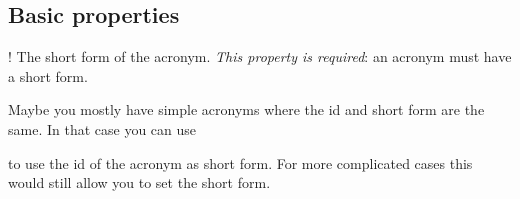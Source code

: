 \documentclass{acro-manual}
\begin{document}
\subsection{Basic properties}\label{sec:basic-properties}
\begin{properties}
  \Default!
    The short form of the acronym.  \emph{This property is required}: an
    acronym must have a short form.
\end{properties}
Maybe you mostly have simple acronyms where the \ac{id} and short form are
the same.  In that case you can use
\begin{options}
    to use the \ac{id} of the acronym as short form. For more complicated
    cases this would still allow you to set the short form.
\end{options}
\end{document}
